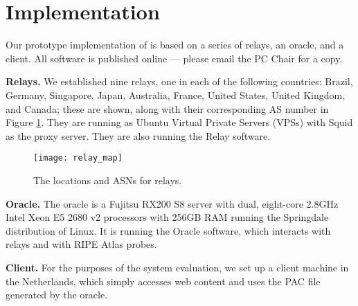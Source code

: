 \section{Implementation}
Our prototype implementation of \system{} is based on a series of relays, an oracle, and 
a client. All \system{} software is published online --- please email the PC Chair for a 
copy.

{\bf Relays.}  We established nine relays, one in each of the following countries: Brazil, 
Germany, Singapore, Japan, Australia, France, United States, United Kingdom, and Canada; these 
are shown, along with their corresponding AS number in Figure \ref{fig:relay_locations}.  
They are running as Ubuntu Virtual Private Servers (VPSs) with 
Squid as the proxy server.  They are also running the \system{} Relay software.

\begin{figure}[b!]
\centering
\texttt{[image: relay\_map]}
\caption{The locations and ASNs for \system{} relays.}
\label{fig:relay_locations}
\end{figure}

{\bf Oracle.}  The oracle is a Fujitsu RX200 S8 server with dual, 
eight-core 2.8GHz Intel Xeon E5 2680 v2 processors with 256GB RAM running the 
Springdale distribution of Linux. It is running the \system{} Oracle software, 
which interacts with relays and with RIPE Atlas probes.

{\bf Client.} For the purposes of the system evaluation, we set up a client 
machine in the Netherlands, which simply accesses web content and uses the PAC 
file generated by the oracle. 
